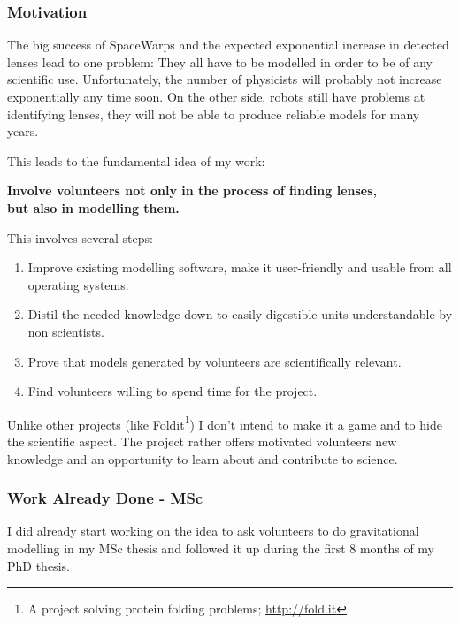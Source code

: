 \documentclass[11pt]{article}
\begin{document}
\subsubsection{Motivation}

The big success of SpaceWarps and the expected exponential increase in detected lenses lead to one problem:
They all have to be modelled in order to be of any scientific use.
Unfortunately, the number of physicists will probably not increase exponentially any time soon.
On the other side, robots still have problems at identifying lenses, they will not be able to produce reliable models for many years.

This leads to the fundamental idea of my work:

{\bf Involve volunteers not only in the process of finding lenses,\\but also in modelling them.}

This involves several steps:

\begin{enumerate}
  \item Improve existing modelling software, make it user-friendly and usable from all operating systems.
  \item Distil the needed knowledge down to easily digestible units understandable by non scientists.
  \item Prove that models generated by volunteers are scientifically relevant.
  \item Find volunteers willing to spend time for the project.
\end{enumerate}

Unlike other projects (like Foldit\footnote{A project solving protein folding problems; \url{http://fold.it}}) I don't intend to make it a game and to hide the scientific aspect.
The project rather offers motivated volunteers new knowledge and an opportunity to learn about and contribute to science.


\subsubsection{Work Already Done - MSc}

I did already start working on the idea to ask volunteers to do gravitational modelling in my MSc thesis and followed it up during the first 8 months of my PhD thesis.
\end{document}
